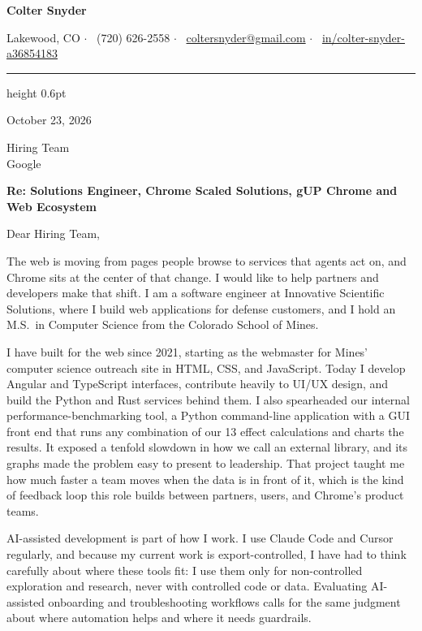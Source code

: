 \documentclass[letterpaper,11pt]{article}
\begin{document}
\begin{center}
  {\Huge\bfseries Colter Snyder}\par\vspace{4pt}
  \footnotesize
  Lakewood, CO \enspace$\cdot$\enspace
  \faPhone*\ (720) 626-2558 \enspace$\cdot$\enspace
  \faEnvelope\ \href{mailto:coltersnyder@gmail.com}{coltersnyder@gmail.com} \enspace$\cdot$\enspace
  \mbox{\faLinkedin\ \href{https://www.linkedin.com/in/colter-snyder-a36854183/}{in/colter-snyder-a36854183}}
\end{center}
{\color{accent}\hrule height 0.6pt}
\vspace{6pt}

October 23, 2026

Hiring Team\\
Google

\textbf{Re: Solutions Engineer, Chrome Scaled Solutions, gUP Chrome and Web Ecosystem}

Dear Hiring Team,

The web is moving from pages people browse to services that agents act on, and Chrome sits at the
center of that change. I would like to help partners and developers make that shift. I am a software
engineer at Innovative Scientific Solutions, where I build web applications for defense customers, and
I hold an M.S.\ in Computer Science from the Colorado School of Mines.

I have built for the web since 2021, starting as the webmaster for Mines' computer science outreach
site in HTML, CSS, and JavaScript. Today I develop Angular and TypeScript interfaces, contribute heavily
to UI/UX design, and build the Python and Rust services behind them. I also spearheaded our internal
performance-benchmarking tool, a Python command-line application with a GUI front end that runs any
combination of our 13 effect calculations and charts the results. It exposed a tenfold slowdown in how
we call an external library, and its graphs made the problem easy to present to leadership. That project taught me how much
faster a team moves when the data is in front of it, which is the kind of feedback loop this role
builds between partners, users, and Chrome's product teams.

AI-assisted development is part of how I work. I use Claude Code and Cursor regularly, and because my
current work is export-controlled, I have had to think carefully about where these tools fit: I use
them only for non-controlled exploration and research, never with controlled code or data. Evaluating
AI-assisted onboarding and troubleshooting workflows calls for the same judgment about where
automation helps and where it needs guardrails.
\end{document}
